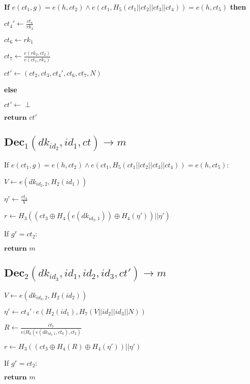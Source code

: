 \documentclass[a4paper]{article}
\begin{document}
\textbf{If} $e(\textit{ct}_1, g) = e(h, \textit{ct}_2) \land e(\textit{ct}_1, H_5(\textit{ct}_1 || \textit{ct}_2 || \textit{ct}_3 || \textit{ct}_4)) = e(h, \textit{ct}_5)$ \textbf{then}

\quad$\textit{ct}_4' \gets \frac{\textit{ct}_4}{\textit{rk}_3}$

$\textit{ct}_6 \gets \textit{rk}_1$

\quad$\textit{ct}_7 \gets \frac{e(\textit{rk}_2, \textit{ct}_2)}{e(\textit{ct}_1, \textit{rk}_1)}$

\quad$\textit{ct}' \gets (\textit{ct}_2, \textit{ct}_3, \textit{ct}_4', \textit{ct}_6, \textit{ct}_7, N)$

\textbf{else}

\quad$\textit{ct}' \gets \perp$

$\textbf{return }\textit{ct}'$

\subsection{$\textbf{Dec}_1(\textit{dk}_{\textit{id}_2}, \textit{id}_1, \textit{ct}) \rightarrow m$}

If $e(\textit{ct}_1, g) = e(h, \textit{ct}_2) \land e(\textit{ct}_1, H_5(\textit{ct}_1 || \textit{ct}_2 || \textit{ct}_3 || \textit{ct}_4)) = e(h, \textit{ct}_5)$: 

\quad$V \gets e(\textit{dk}_{\textit{id}_2, 2}, H_2(\textit{id}_1))$

\quad$\eta' \gets \frac{\textit{ct}_4}{V}$

\quad$r \gets H_3((\textit{ct}_3 \oplus H_4(e(\textit{dk}_{\textit{id}_2, 1})) \oplus H_4(\eta')) || \eta')$

\quad If $g^r = \textit{ct}_2$: 

$\textbf{return }m$

\subsection{$\textbf{Dec}_2(\textit{dk}_{\textit{id}_3}, \textit{id}_1, \textit{id}_2, \textit{id}_3, \textit{ct}') \rightarrow m$}

$V \gets e(\textit{dk}_{\textit{id}_3, 2}, H_2(\textit{id}_2))$

$\eta' \gets \textit{ct}_4' \cdot e(H_2(\textit{id}_1), H_7(V || \textit{id}_2 || \textit{id}_3 || N))$

$R \gets \frac{\textit{ct}_7}{e(H_6(e(\textit{dk}_{\textit{id}_3, 1}, \textit{ct}_6), \textit{ct}_2)}$

$r \gets H_3((\textit{ct}_3 \oplus H_4(R) \oplus H_4(\eta')) || \eta')$

If $g^r = \textit{ct}_2$: 

$\textbf{return }m$
\end{document}

